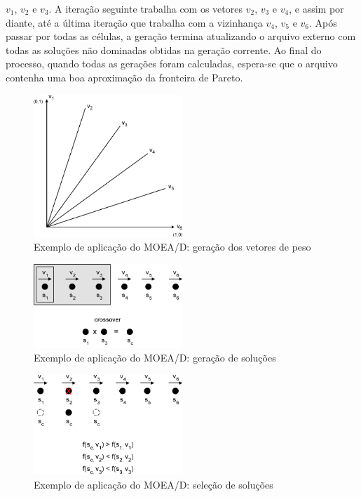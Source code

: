 $v_1$, $v_2$ e $v_3$. A iteração seguinte trabalha com os vetores $v_2$, $v_3$ e $v_4$, e assim por diante, até a última iteração que trabalha com a vizinhança $v_4$, $v_5$ e $v_6$. Após passar por todas as células, a geração termina atualizando o arquivo externo com todas as soluções não dominadas obtidas na geração corrente. Ao final do processo, quando todas as gerações foram calculadas, espera-se que o arquivo contenha uma boa aproximação da fronteira de Pareto.

\begin{figure}[!htbp]
	\centering
	\includegraphics[width=0.5\textwidth]{cap_otimizacao-multi/figs/moead-ex1}
	\caption{\label{fig_moead_ex1}Exemplo de aplicação do MOEA/D: geração dos vetores de peso}
\end{figure}

\begin{figure}[!htbp]
	\centering
	\includegraphics[width=0.5\textwidth]{cap_otimizacao-multi/figs/moead-ex2}
	\caption{\label{fig_moead_ex2}Exemplo de aplicação do MOEA/D: geração de soluções}
\end{figure}

\begin{figure}[!htbp]
	\centering
	\includegraphics[width=0.5\textwidth]{cap_otimizacao-multi/figs/moead-ex3}
	\caption{\label{fig_moead_ex3}Exemplo de aplicação do MOEA/D: seleção de soluções}
\end{figure}


